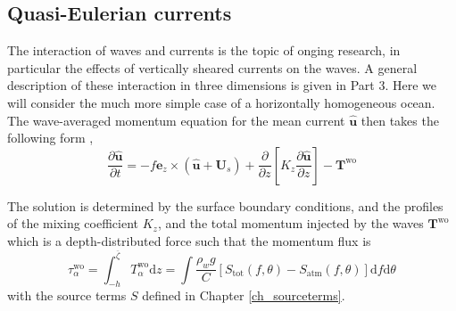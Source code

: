 \subsection{Quasi-Eulerian currents}
The interaction of waves and currents is the topic of onging research, in particular the effects of vertically sheared currents on the waves. 
A general description of these interaction in three dimensions is given in Part 3. Here 
we will consider the much more simple case of a horizontally homogeneous ocean. The wave-averaged momentum equation for the mean current $ \widehat{\mathbf u}$
then takes the following form \citep{Hasselmann1970,Xu&Bowen1994}, 
\begin{equation}
 \frac{\partial \widehat{\mathbf u}}{\partial t}
  = 
 - f {\mathbf e}_z \times \left(\widehat{\mathbf u}+{\mathbf U}_{s}\right) + \frac{\partial}{\partial z} \left[{K_z} \frac{\partial
\widehat{\mathbf u} }{\partial z}\right] - {\mathbf T}^{\mathrm{wo}} 
 \label{avgmomz2}
\end{equation}

The solution is determined by the surface boundary conditions, and the profiles of the mixing coefficient $K_z$,  
and the total momentum injected by the waves ${\mathbf T}^{\mathrm{wo}}$ which is a depth-distributed force such that the momentum flux is 
\begin{equation}
\tau^{\mathrm{wo}}_{\alpha} = \int_{-h}^{\overline{\zeta}} T^{\mathrm{wo}}_{\alpha} {\mathrm d}z = \int \frac{\rho_w g}{C}\left[ S_{\mathrm{tot}}(f,\theta) -S_{\mathrm{atm}}(f,\theta)  \right] {\mathrm d}f {\mathrm d} \theta 
 \end{equation}
 with the source terms $S$ defined in Chapter \ref{ch_sourceterms}. 
 
